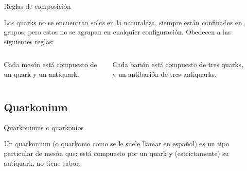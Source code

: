 \begin{frame}{Reglas de composición}

    Los quarks no se encuentran solos en la naturaleza, siempre están confinados en grupos, pero estos no se agrupan en cualquier configuración. Obedecen a las siguientes reglas: 
    
    \begin{columns}
    \begin{column}{0.5\textwidth}
       \begin{tcolorbox}[colback=blue!5!white, colframe =blue!75!black, title=Mesones]
            Cada mesón está compuesto de un quark y un antiquark.
        \end{tcolorbox}
    \end{column}
    \begin{column}{0.5\textwidth}  
        \begin{center}
             \begin{tcolorbox}[colback=blue!5!white, colframe =blue!75!black, title=Bariones]
                Cada barión está compuesto de tres quarks, y un antibarión de tres antiquarks.
            \end{tcolorbox}
         \end{center}
    \end{column}
    \end{columns}
\end{frame}

\subsection{Quarkonium}

\begin{frame}{Quarkoniums o quarkonios}
    \begin{tcolorbox}[colback=blue!5!white, colframe =blue!75!black, title=Definición]
        Un quarkonium (o quarkonio como se le suele llamar en español) es un tipo particular de mesón que:
        está compuesto por un quark y (estrictamente) su antiquark, no tiene sabor.
    \end{tcolorbox}
\end{frame}

